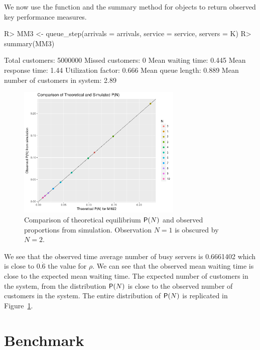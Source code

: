 \documentclass[article]{jss}
\begin{document}
We now use the  function and the summary method for  objects  to return observed key performance measures. 

\begin{CodeChunk}
\begin{CodeInput}
R> MM3 <- queue_step(arrivals = arrivals, service = service, servers = K)
R> summary(MM3)
\end{CodeInput}
\begin{CodeOutput}
Total customers:
 5000000
Missed customers:
 0
Mean waiting time:
 0.445
Mean response time:
 1.44
Utilization factor:
 0.666
Mean queue length:
 0.889
Mean number of customers in system:
 2.89
\end{CodeOutput}
\end{CodeChunk}

\begin{figure}[!htb]
  \centering
  \includegraphics[width = 0.7\textwidth]{figures/theoretical.pdf}
  \caption{Comparison of theoretical equilibrium $\mathsf{P}(N)$ and observed proportions from simulation. Observation $N = 1$ is obscured by $N = 2$.}
  \label{fig:theoretical}
\end{figure}

We see that the observed time average number of busy servers is 0.6661402 which is close to $0.\dot{6}$ the value for $\rho$. We can see that the observed mean waiting time is close to the expected mean waiting time. The expected number of customers in the system, from the distribution $\mathsf{P}(N)$ is close to the observed number of customers in the system. The entire distribution of $\mathsf{P}(N)$ is replicated in Figure~\ref{fig:theoretical}. 

\section{Benchmark} \label{sec:Benchmark}
\end{document}
